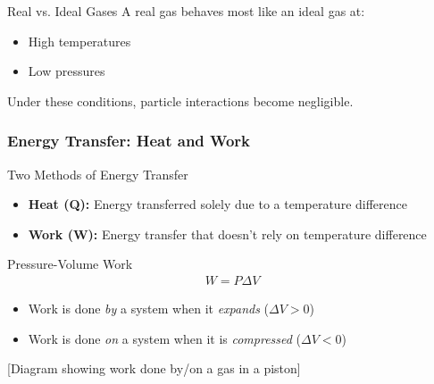 \documentclass{beamer}
\begin{document}
\begin{frame}
    \begin{exampleblock}{Real vs. Ideal Gases}
        A real gas behaves most like an ideal gas at:
        \begin{itemize}
            \item High temperatures
            \item Low pressures
        \end{itemize}
        Under these conditions, particle interactions become negligible.
    \end{exampleblock}
\end{frame}

\begin{frame}
    \frametitle{Energy Transfer: Heat and Work}
    \begin{block}{Two Methods of Energy Transfer}
        \begin{itemize}
            \item \textbf{Heat (Q):} Energy transferred solely due to a temperature difference
            \item \textbf{Work (W):} Energy transfer that doesn't rely on temperature difference
        \end{itemize}
    \end{block}
    
    \begin{exampleblock}{Pressure-Volume Work}
        \begin{align*}
            W = P\Delta V
        \end{align*}
        
        \begin{itemize}
            \item Work is done \textit{by} a system when it \textit{expands} ($\Delta V > 0$)
            \item Work is done \textit{on} a system when it is \textit{compressed} ($\Delta V < 0$)
        \end{itemize}
    \end{exampleblock}
    
    \begin{center}
        \alert{[Diagram showing work done by/on a gas in a piston]}
    \end{center}
\end{frame}
\end{document}
